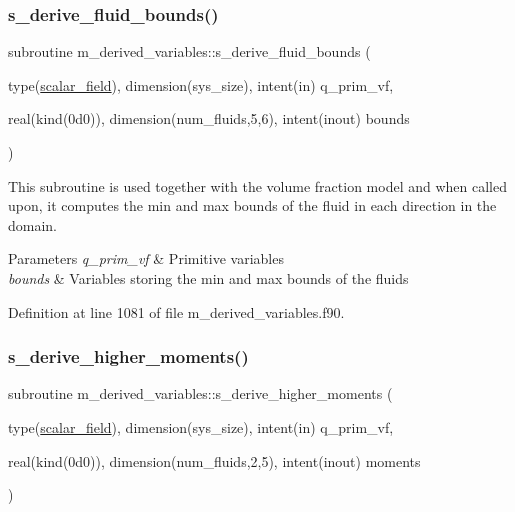 \mbox{\label{namespacem__derived__variables_abdf1859a7ad678848feb69bbe89a2f95}} 
\subsubsection{\texorpdfstring{s\+\_\+derive\+\_\+fluid\+\_\+bounds()}{s\_derive\_fluid\_bounds()}}
{\footnotesize\ttfamily subroutine m\+\_\+derived\+\_\+variables\+::s\+\_\+derive\+\_\+fluid\+\_\+bounds (\begin{DoxyParamCaption}\item[{type(\hyperlink{structm__derived__types_1_1scalar__field}{scalar\+\_\+field}), dimension(sys\+\_\+size), intent(in)}]{q\+\_\+prim\+\_\+vf,  }\item[{real(kind(0d0)), dimension(num\+\_\+fluids,5,6), intent(inout)}]{bounds }\end{DoxyParamCaption})}



This subroutine is used together with the volume fraction model and when called upon, it computes the min and max bounds of the fluid in each direction in the domain. 


\begin{DoxyParams}{Parameters}
{\em q\+\_\+prim\+\_\+vf} & Primitive variables \\
\hline
{\em bounds} & Variables storing the min and max bounds of the fluids \\
\hline
\end{DoxyParams}


Definition at line 1081 of file m\+\_\+derived\+\_\+variables.\+f90.

\mbox{\label{namespacem__derived__variables_ab28af564606ca901d3953e6012e9a452}} 
\subsubsection{\texorpdfstring{s\+\_\+derive\+\_\+higher\+\_\+moments()}{s\_derive\_higher\_moments()}}
{\footnotesize\ttfamily subroutine m\+\_\+derived\+\_\+variables\+::s\+\_\+derive\+\_\+higher\+\_\+moments (\begin{DoxyParamCaption}\item[{type(\hyperlink{structm__derived__types_1_1scalar__field}{scalar\+\_\+field}), dimension(sys\+\_\+size), intent(in)}]{q\+\_\+prim\+\_\+vf,  }\item[{real(kind(0d0)), dimension(num\+\_\+fluids,2,5), intent(inout)}]{moments }\end{DoxyParamCaption})}



